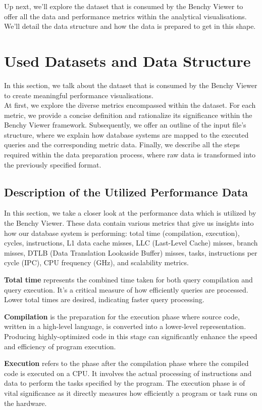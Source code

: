 Up next, we'll explore the dataset that is consumed by the Benchy Viewer to offer all the data and performance metrics within the analytical visualisations. We'll detail the data structure and how the data is prepared to get in this shape.

\section{Used Datasets and Data Structure}
In this section, we talk about the dataset that is consumed by the Benchy Viewer to create meaningful performance visualisations.\\
At first, we explore the diverse metrics encompassed within the dataset. For each metric, we provide a concise definition and rationalize its significance within the Benchy Viewer framework. Subsequently,  we offer an outline of the input file's structure, where we explain how database systems are mapped to the executed queries and the corresponding metric data. Finally, we describe all the steps required within the data preparation process, where raw data is transformed into the previously specified format.

\subsection{Description of the Utilized Performance Data}
In this section, we take a closer look at the performance data which is utilized by the Benchy Viewer. These data contain various metrics that give us insights into how our database system is performing: total time (compilation, execution), cycles, instructions, L1 data cache misses, LLC (Last-Level Cache) misses, branch misses, DTLB (Data Translation Lookaside Buffer) misses, tasks, instructions per cycle (IPC), CPU frequency (GHz), and scalability metrics. 

\textbf{Total time} represents the combined time taken for both query compilation and query execution. It's a critical measure of how efficiently queries are processed. Lower total times are desired, indicating faster query processing.

\textbf{Compilation} is the preparation for the execution phase where source code, written in a high-level language, is converted into a lower-level representation. Producing highly-optimized code in this stage can significantly enhance the speed and efficiency of program execution.

\textbf{Execution} refers to the phase after the compilation phase where the compiled code is executed on a CPU. It involves the actual processing of instructions and data to perform the tasks specified by the program. The execution phase is of vital significance as it directly measures how efficiently a program or task runs on the hardware.


